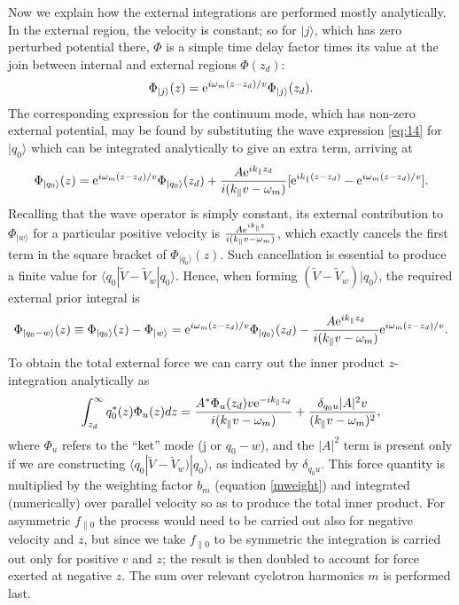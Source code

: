 \documentclass[12pt]{article}
\def\ket#1{|#1\rangle}
\def\bra#1{\langle#1}
\def\etothe#1{{\rm e}^{#1}}
\begin{document}
Now we explain how the external integrations are performed mostly
analytically.  In the external region, the velocity is constant; so
for $\ket{j}$, which has zero perturbed potential there, $\Phi$ is a
simple time delay factor times its value at the join between internal
and external regions $\Phi(z_d)$:
\begin{equation}
  \label{phi4}
  \Phi_{\ket{j}}(z)=\etothe{i\omega_m(z-z_d)/v}   \Phi_{\ket{j}}(z_d).
\end{equation}
The corresponding expression for the continuum mode, which has
non-zero external potential, may be
found by substituting the wave expression \ref{eq:14} for  $\ket{q_0}$
which can be integrated analytically to give an extra term, arriving
at 
\begin{equation}
  \label{phiq}
  \Phi_{\ket{q_0}}(z)=\etothe{i\omega_m(z-z_d)/v}   \Phi_{\ket{q_0}}(z_d)
  +{A\etothe{ik_\parallel z_d}\over i(k_\parallel v-\omega_m)}[\etothe{ik_\parallel(z-z_d)}
  -\etothe{i\omega_m(z-z_d)/v}].
\end{equation}
Recalling that the wave operator is simply constant, its external
contribution to $\Phi_{\ket{w}}$ for a particular positive velocity is
${A\etothe{ik_\parallel z}\over i(k_\parallel v-\omega_m)}$, which
exactly cancels the first term in the square bracket of
$\Phi_{\ket{q_0}}(z)$. Such cancellation is essential to produce a
finite value for $\bra{q_0}|\tilde V -\tilde V_w\ket{q_0}$. Hence,
when forming
$(\tilde V -\tilde V_w)\ket{q_0}$, the required external prior
integral is
\begin{equation}
  \label{phidiff}
  \Phi_{\ket{q_0-w}}(z)\equiv \Phi_{\ket{q_0}}(z)-\Phi_{\ket{w}}
  =\etothe{i\omega_m(z-z_d)/v}   \Phi_{\ket{q_0}}(z_d)
  -{A\etothe{ik_\parallel z_d}\over i(k_\parallel v-\omega_m)}
  \etothe{i\omega_m(z-z_d)/v}.
\end{equation}
To obtain the total external force we can carry out the inner product
$z$-integration analytically as
\begin{equation}
  \label{extforce}
  \int_{z_d}^\infty q_0^*(z) \Phi_u(z)  dz =
  {A^*\Phi_u(z_d)v\etothe{-ik_\parallel z_d}\over i(k_\parallel  v-\omega_m)}
  + {\delta_{q_0u}|A|^2v\over (k_\parallel v-\omega_m)^2},
\end{equation}
where $\Phi_u$ refers to the ``ket'' mode (j or $q_0-w$), and the
$|A|^2$ term is present only if we are constructing
$\bra{q_0}|\tilde V -\tilde V_w)\ket{q_0}$, as indicated by
$\delta_{q_0u}$. This force quantity is multiplied by the
weighting factor $b_m$ (equation \ref{mweight}) and integrated
(numerically) over parallel velocity so as to produce the total inner
product. For asymmetric $f_{\parallel0}$ the process would need to be
carried out also for negative velocity and $z$, but since we take
$f_{\parallel0}$ to be symmetric the integration is carried out only
for positive $v$ and $z$; the result is then doubled to account for
force exerted at negative $z$. The sum over relevant cyclotron
harmonics $m$ is performed last.
\end{document}
